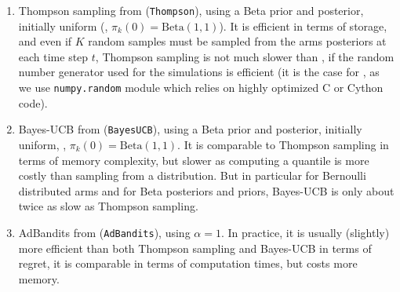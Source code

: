 \begin{enumerate}
    \item
    Thompson sampling from \cite{Kaufmann12Thompson} (\texttt{Thompson}), using a Beta prior and posterior, initially uniform (\ie, $\pi_k(0)=\mathrm{Beta}(1,1)$).
    It is efficient in terms of storage, and even if $K$ random samples must be sampled from the arms posteriors at each time step $t$, Thompson sampling is not much slower than \UCB, if the random number generator used for the simulations is efficient (it is the case for \SMPyBandits, as we use \texttt{numpy.random} module which relies on highly optimized C or Cython code).

    \item
    Bayes-UCB from \cite{Kaufmann12BUCB} (\texttt{BayesUCB}), using a Beta prior and posterior, initially uniform, \ie, $\pi_k(0)=\mathrm{Beta}(1,1)$.
    It is comparable to Thompson sampling in terms of memory complexity, but slower as computing a quantile is more costly than sampling from a distribution.
    But in particular for Bernoulli distributed arms and for Beta posteriors and priors, Bayes-UCB is only about twice as slow as Thompson sampling.

    \item
    AdBandits from \cite{Truzzi13} (\texttt{AdBandits}), using $\alpha=1$.
    In practice, it is usually (slightly) more efficient than both Thompson sampling and Bayes-UCB in terms of regret, it is comparable in terms of computation times, but costs more memory.


\end{enumerate}
